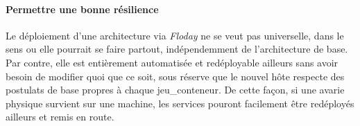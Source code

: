 \paragraph{Permettre une bonne résilience}
Le déploiement d'une architecture via \emph{Floday} ne se veut pas universelle, dans le sens ou elle pourrait se faire partout, indépendemment de l'architecture de base.
Par contre, elle est entièrement automatisée et redéployable ailleurs sans avoir besoin de modifier quoi que ce soit, sous réserve que le nouvel hôte respecte des postulats de base propres à chaque \gls{jeu_conteneur}.
De cette façon, si une avarie physique survient sur une machine, les services pouront facilement être redéployés ailleurs et remis en route.
